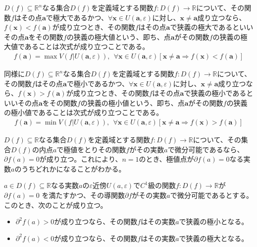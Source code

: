 \documentclass[dvipdfmx]{jsarticle}
\begin{document}
\begin{dfn*}
$D(f) \subseteq \mathbb{R}^{n}$なる集合$D(f)$を定義域とする関数$f:D(f) \rightarrow \mathbb{R}$について、その関数$f$はその点$\mathbf{a}$で極大であるかつ、$\forall\mathbf{x} \in U\left( \mathbf{a},\varepsilon \right)$に対し、$\mathbf{x} \neq \mathbf{a}$成り立つなら、$f\left( \mathbf{x} \right) < f\left( \mathbf{a} \right)$が成り立つとき、その関数$f$はその点$\mathbf{a}$で狭義の極大であるといいその点$\mathbf{a}$をその関数$f$の狭義の極大値という、即ち、点$\mathbf{a}$がその関数$f$の狭義の極大値であることは次式が成り立つことである。
\begin{align*}
f\left( \mathbf{a} \right) = \max{V\left( f|U\left( \mathbf{a},\varepsilon \right) \right)},\ \ \forall\mathbf{x} \in U\left( \mathbf{a},\varepsilon \right)\left[ \mathbf{x} \neq \mathbf{a} \Rightarrow f\left( \mathbf{x} \right) < f\left( \mathbf{a} \right) \right]
\end{align*}\par
同様に$D(f) \subseteq \mathbb{R}^{n}$なる集合$D(f)$を定義域とする関数$f:D(f) \rightarrow \mathbb{R}$について、その関数$f$はその点$\mathbf{a}$で極小であるかつ、$\forall\mathbf{x} \in U\left( \mathbf{a},\varepsilon \right)$に対し、$\mathbf{x} \neq \mathbf{a}$成り立つなら、$f\left( \mathbf{x} \right) > f\left( \mathbf{a} \right)$が成り立つとき、その関数$f$はその点$\mathbf{a}$で狭義の極小であるといいその点$\mathbf{a}$をその関数$f$の狭義の極小値という、即ち、点$\mathbf{a}$がその関数$f$の狭義の極小値であることは次式が成り立つことである。
\begin{align*}
f\left( \mathbf{a} \right) = \min{V\left( f|U\left( \mathbf{a},\varepsilon \right) \right)},\ \ \forall\mathbf{x} \in U\left( \mathbf{a},\varepsilon \right)\left[ \mathbf{x} \neq \mathbf{a} \Rightarrow f\left( \mathbf{x} \right) > f\left( \mathbf{a} \right) \right]
\end{align*}
\end{dfn*}
\begin{thm*}
$D(f) \subseteq \mathbb{R}$なる集合$D(f)$を定義域とする関数$f:D(f) \rightarrow \mathbb{R}$について、その集合$D(f)$の内点$a$で極値をとりその関数$f$がその実数$a$で微分可能であるなら、$\partial f(a) = 0$が成り立つ。これにより、$n = 1$のとき、極値点が$\partial f(a) = 0$なる実数$a$のうちどれかになることがわかる。
\end{thm*}
\begin{thm*}
$a \in D(f) \subseteq \mathbb{R}$なる実数$a$の$\varepsilon$近傍$U(a,\varepsilon)$で$C^{1}$級の関数$f:D(f) \rightarrow \mathbb{R}$が$\partial f(a) = 0$
を満たすかつ、その導関数$\partial f$がその実数$a$で微分可能であるとする。このとき、次のことが成り立つ。
\begin{itemize}
\item
  $\partial^{2}f(a) > 0$が成り立つなら、その関数$f$はその実数$a$で狭義の極小となる。
\item
  $\partial^{2}f(a) < 0$が成り立つなら、その関数$f$はその実数$a$で狭義の極大となる。
\end{itemize}
\end{thm*}\par
\end{document}

